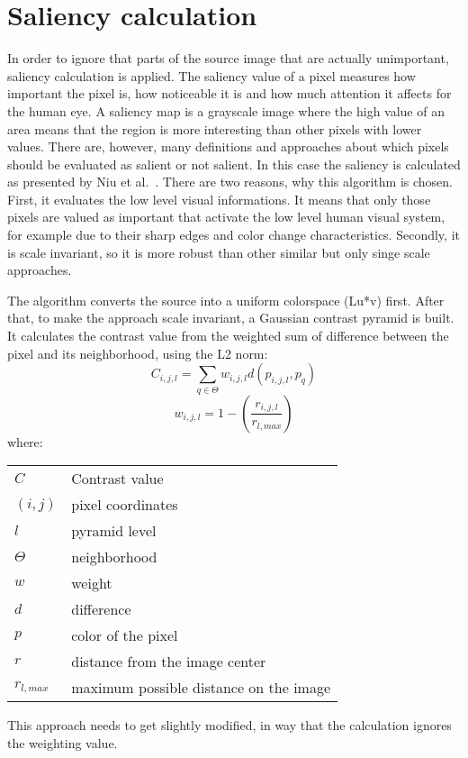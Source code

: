 \documentclass[draft,final]{vutinfth} %
\makeatletter
\newenvironment{conditions}
{\par\vspace{\abovedisplayskip}\noindent\begin{tabular}{>{$}l<{$} @{${}={}$} l}}
	{\end{tabular}\par\vspace{\belowdisplayskip}}
\makeatother
\begin{document}
	\section{Saliency calculation}
	In order to ignore that parts of the source image that are actually unimportant, saliency calculation is applied.
	The saliency value of a pixel measures how important the pixel is, how noticeable it is and how much attention it affects for the human eye.
	A saliency map is a grayscale image where the high value of an area means that the region is more interesting than other pixels with lower values.
	There are, however, many definitions and approaches about which pixels should be evaluated as salient or not salient.
	In this case the saliency is calculated as presented by Niu et al.~\cite{niu2012image}. 
	There are two reasons, why this algorithm is chosen.
	First, it evaluates the low level visual informations.
	It means that only those pixels are valued as important that activate the low level human visual system, for example due to their sharp edges and color change characteristics.
	Secondly, it is scale invariant, so it is more robust than other similar but only singe scale approaches.\par 
	The algorithm converts the source into a uniform colorspace (Lu*v) first.
	After that, to make the approach scale invariant, a Gaussian contrast pyramid is built.
	It calculates the contrast value from the weighted sum of difference between the pixel and its neighborhood, using the L2 norm:	
	\[ C_{i,j,l}=\sum\limits_{q\in\Theta}w_{i,j,l}d(p_{i,j,l},p_{q}) \]
	\[ w_{i,j,l}=1-\left(\frac{r_{i,j,l}}{r_{l,max}}\right) \]
	where:
	\begin{center}
		\begin{conditions}
			C & Contrast value \\
			(i, j) & pixel coordinates \\
			l & pyramid level \\
			\Theta & neighborhood \\
			w & weight \\
			d & difference \\
			p & color of the pixel \\
			r & distance from the image center \\
			r_{l, max} & maximum possible distance on the image
		\end{conditions}
	\end{center}
	This approach needs to get slightly modified, in way that the calculation ignores the weighting value.
\end{document}
